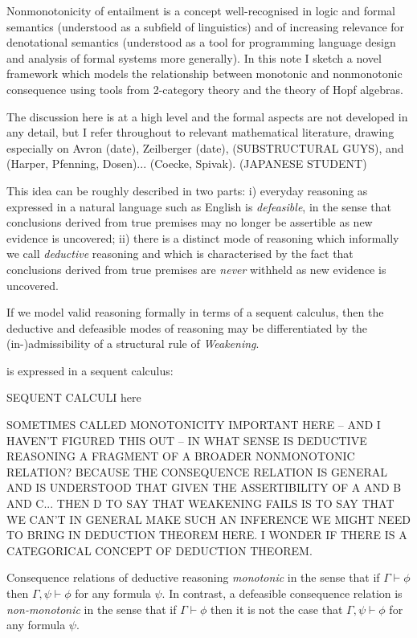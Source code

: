 \documentclass[a4paper,11pt]{report}
\begin{document}
Nonmonotonicity of entailment is a concept well-recognised in logic and formal semantics (understood as a subfield of linguistics) and of increasing relevance for denotational semantics (understood as a tool for programming language design and analysis of formal systems more generally). 
In this note I sketch a novel framework which models the relationship between monotonic and nonmonotonic consequence using tools from 2-category theory and the theory of Hopf algebras. 



The discussion here is at a high level and the formal aspects are not developed in any detail, but I refer throughout to relevant mathematical literature, drawing especially on Avron (date), Zeilberger (date), (SUBSTRUCTURAL GUYS), and (Harper, Pfenning, Dosen)... (Coecke, Spivak). (JAPANESE STUDENT)

This idea can be roughly described in two parts: i) everyday reasoning as expressed in a natural language such as English is \emph{defeasible}, in the sense that conclusions derived from true premises may no longer be assertible as new evidence is uncovered; ii) there is a distinct mode of reasoning which informally we call \emph{deductive} reasoning and which is characterised by the fact that conclusions derived from true premises are \emph{never} withheld as new evidence is uncovered.

If we model valid reasoning formally in terms of a sequent calculus, then the deductive and defeasible modes of reasoning may be differentiated by the (in-)admissibility of a structural rule of \emph{Weakening}.

is expressed in a sequent calculus:

SEQUENT CALCULI here

SOMETIMES CALLED MONOTONICITY
IMPORTANT HERE -- AND I HAVEN'T FIGURED THIS OUT -- IN WHAT SENSE IS DEDUCTIVE REASONING A FRAGMENT OF A BROADER NONMONOTONIC RELATION? BECAUSE THE CONSEQUENCE RELATION IS GENERAL AND IS UNDERSTOOD THAT GIVEN THE ASSERTIBILITY OF A AND B AND C... THEN D
TO SAY THAT WEAKENING FAILS IS TO SAY THAT WE CAN'T IN GENERAL MAKE SUCH AN INFERENCE
WE MIGHT NEED TO BRING IN DEDUCTION THEOREM HERE. I WONDER IF THERE IS A CATEGORICAL CONCEPT OF DEDUCTION THEOREM.

Consequence relations of deductive reasoning  \emph{monotonic} in the sense that if $\Gamma \vdash \phi$ then $\Gamma, \psi \vdash \phi$ for any formula $\psi$. In contrast, a defeasible consequence relation is \emph{non-monotonic} in the sense that if $\Gamma \vdash \phi$ then it is not the case that $\Gamma, \psi \vdash \phi$ for any formula $\psi$.
\end{document}
